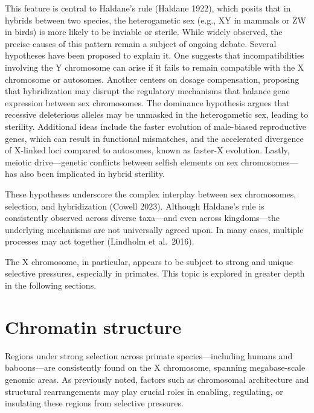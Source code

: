 \documentclass[
  a4paper,
]{scrbook}
\begin{document}
This feature is central to Haldane's rule \cite{Haldane1922} (Haldane
1922), which posits that in hybrids between two species, the
heterogametic sex (e.g., XY in mammals or ZW in birds) is more likely to
be inviable or sterile. While widely observed, the precise causes of
this pattern remain a subject of ongoing debate. Several hypotheses have
been proposed to explain it. One suggests that incompatibilities
involving the Y chromosome can arise if it fails to remain compatible
with the X chromosome or autosomes. Another centers on dosage
compensation, proposing that hybridization may disrupt the regulatory
mechanisms that balance gene expression between sex chromosomes. The
dominance hypothesis argues that recessive deleterious alleles may be
unmasked in the heterogametic sex, leading to sterility. Additional
ideas include the faster evolution of male-biased reproductive genes,
which can result in functional mismatches, and the accelerated
divergence of X-linked loci compared to autosomes, known as faster-X
evolution. Lastly, meiotic drive---genetic conflicts between selfish
elements on sex chromosomes---has also been implicated in hybrid
sterility.

These hypotheses underscore the complex interplay between sex
chromosomes, selection, and hybridization \cite{Cowell2023} (Cowell
2023). Although Haldane's rule is consistently observed across diverse
taxa---and even across kingdoms---the underlying mechanisms are not
universally agreed upon. In many cases, multiple processes may act
together \cite{Lindholm2016} (Lindholm et al.~2016).

The X chromosome, in particular, appears to be subject to strong and
unique selective pressures, especially in primates. This topic is
explored in greater depth in the following sections.

\chapter{Chromatin structure}\label{chromatin-structure}

Regions under strong selection across primate species---including humans
and baboons---are consistently found on the X chromosome, spanning
megabase-scale genomic areas. As previously noted, factors such as
chromosomal architecture and structural rearrangements may play crucial
roles in enabling, regulating, or insulating these regions from
selective pressures.
\end{document}
